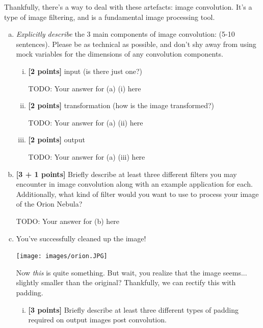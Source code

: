 Thankfully, there's a way to deal with these artefacts: image convolution. It's a type of image filtering, and is a fundamental image processing tool.

\begin{enumerate}[(a)]
\item \emph{Explicitly describe} the 3 main components of image convolution: (5-10 sentences). Please be as technical as possible, and don't shy away from using mock variables for the dimensions of any convolution components.
\begin{enumerate}[(i)]
    \item \textbf{[2 points]} input (is there just one?) 

    \begin{mdframed}
        TODO: Your answer for (a) (i) here
    \end{mdframed}
    
    \item \textbf{[2 points]} transformation (how is the image transformed?) 

    \begin{mdframed}
        TODO: Your answer for (a) (ii) here
    \end{mdframed}
    
    \item \textbf{[2 points]} output
    
    \begin{mdframed}
        TODO: Your answer for (a) (iii) here
    \end{mdframed}
    
\end{enumerate}

\item \textbf{[3 + 1 points]} Briefly describe at least three different filters you may encounter in image convolution along with an example application for each. Additionally, what kind of filter would you want to use to process your image of the Orion Nebula? 

\begin{mdframed}
    TODO: Your answer for (b) here
\end{mdframed}

\item
You've successfully cleaned up the image!

\texttt{[image: images/orion.JPG]}

Now \textit{this} is quite something. But wait, you realize that the image seems... slightly smaller than the original? Thankfully, we can rectify this with padding.
\begin{enumerate}[(i)]
    \item \textbf{[3 points]} Briefly describe at least three different types of padding required on output images post convolution.


\end{enumerate}
\end{enumerate}
